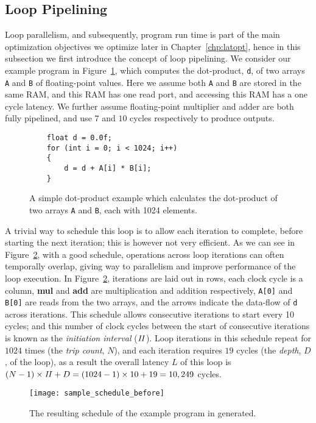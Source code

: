 \subsection{Loop Pipelining}
\label{bg:sub:loop_pipelining}

Loop parallelism, and subsequently, program run time is part of the main
optimization objectives we optimize later in Chapter~\ref{chp:latopt}, hence
in this subsection we first introduce the concept of loop pipelining.  We
consider our example program in Figure~\ref{bg:lst:dotprod}, which computes the
dot-product, \verb|d|, of two arrays \verb|A| and \verb|B| of floating-point
values.  Here we assume both \verb|A| and \verb|B| are stored in the same RAM,
and this RAM has one read port, and accessing this RAM has a one cycle latency.
We further assume floating-point multiplier and adder are both fully pipelined,
and use $7$ and $10$ cycles respectively to produce outputs.
\begin{figure}[ht]
    \centering
    \begin{minipage}{0.7\textwidth}
    \begin{lstlisting}
    float d = 0.0f;
    for (int i = 0; i < 1024; i++)
    {
        d = d + A[i] * B[i];
    }
    \end{lstlisting}
    \end{minipage}
    \caption{%
        A simple dot-product example which calculates the dot-product of two
        arrays \texttt{A} and \texttt{B}, each with 1024 elements.
    }\label{bg:lst:dotprod}
\end{figure}

A trivial way to schedule this loop is to allow each iteration to complete,
before starting the next iteration; this is however not very efficient.
As we can see in Figure~\ref{bg:fig:sample_schedule_before}, with a good
schedule, operations across loop iterations can often temporally overlap,
giving way to parallelism and improve performance of the loop execution.  In
Figure~\ref{bg:fig:sample_schedule_before}, iterations are laid out in rows,
each clock cycle is a column, \textbf{mul} and \textbf{add} are multiplication
and addition respectively, \verb|A[0]| and \verb|B[0]| are reads from the two
arrays, and the arrows indicate the data-flow of \verb|d| across iterations.
This schedule allows consecutive iterations to start every 10 cycles; and this
number of clock cycles between the start of consecutive iterations is known
as the \emph{initiation interval} ($\mathit{II}$).  Loop iterations in this schedule
repeat for $1024$ times (the \emph{trip count}, $N$), and each iteration
requires $19$ cycles (the \emph{depth}, $D$, of the loop), as a result the
overall latency $L$ of this loop is $(N - 1) \times \mathit{II} + D = (1024 - 1) \times
10 + 19 = 10,249$ cycles.
\begin{figure}[ht]
    \centering
    \texttt{[image: sample\_schedule\_before]}
    \caption{%
        The resulting schedule of the example program in generated.
    }\label{bg:fig:sample_schedule_before}
\end{figure}

